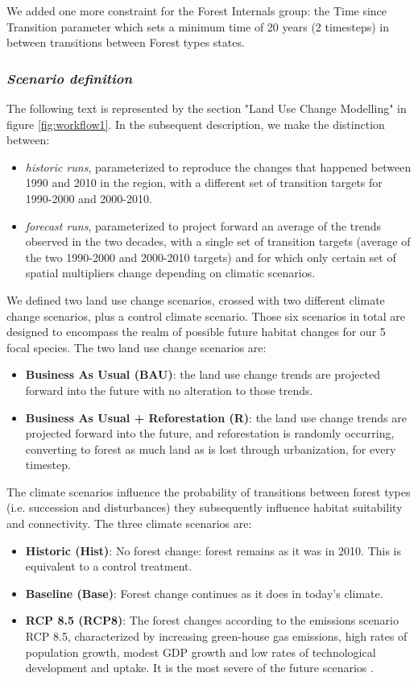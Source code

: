 We added one more constraint for the Forest Internals group: the Time since Transition parameter which sets a minimum time of 20 years (2 timesteps) in between transitions between Forest  types states.\\

\subsubsection*{\textit{Scenario definition}}

The following text is represented by the section "Land Use Change Modelling" in figure \ref{fig:workflow1}. In the subsequent description, we make the distinction between:
\begin{itemize}
\item{\textit{historic runs}}, parameterized to reproduce the changes that happened between 1990 and 2010 in the region, with a different set of transition targets for 1990-2000 and 2000-2010.
\item{\textit{forecast runs}}, parameterized to project forward an average of the trends observed in the two decades, with a single set of transition targets (average of the two 1990-2000 and 2000-2010 targets) and for which only certain set of spatial multipliers change depending on climatic scenarios.
\end{itemize}
We defined two land use change scenarios, crossed with two different climate change scenarios, plus a control climate scenario. Those six scenarios in total are designed to  encompass the realm of possible future habitat changes for our 5 focal species.
The two land use change scenarios are:
\begin{itemize}
\item{\textbf{Business As Usual (BAU)}}: the land use change trends are projected forward into the future with no alteration to those trends.
\item {\textbf{Business As Usual + Reforestation (R)}}: the land use change trends are projected forward into the future, and reforestation is randomly occurring, converting to forest as much land as is lost through urbanization, for every timestep.
\end{itemize}
The climate scenarios influence the probability of transitions between forest types (i.e. succession and disturbances) they subsequently influence habitat suitability and connectivity. The three climate scenarios are:
\begin{itemize}
\item{\textbf{Historic (Hist)}}: No forest change: forest remains as it was in 2010. This is equivalent to a control treatment.
\item{\textbf{Baseline (Base)}}: Forest change continues as it does in today's climate.
\item{\textbf{RCP 8.5 (RCP8)}}: The forest changes according to the emissions scenario RCP 8.5, characterized by increasing green-house gas emissions, high rates of population growth, modest GDP growth and low rates of technological development and uptake. It is the most severe of the future scenarios \citep{ipcc_summary_2013}.\\
\end{itemize}

